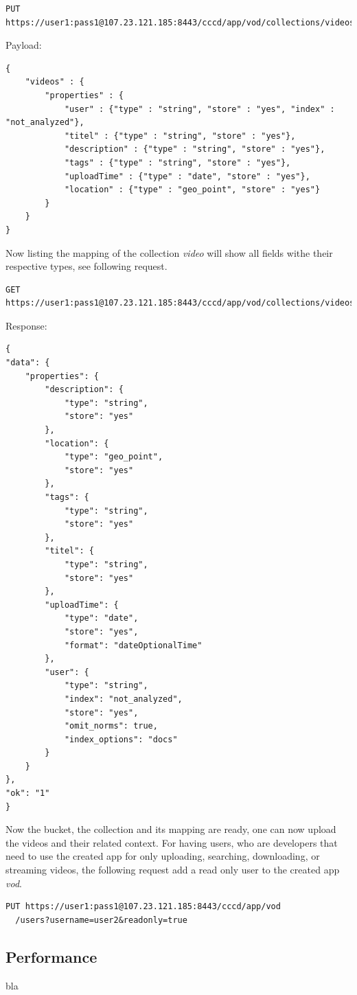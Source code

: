 \begin{code}
\begin{verbatim}
PUT https://user1:pass1@107.23.121.185:8443/cccd/app/vod/collections/videos/mapping
\end{verbatim}
Payload:
\begin{verbatim}
{
    "videos" : {
        "properties" : {
            "user" : {"type" : "string", "store" : "yes", "index" : "not_analyzed"},
            "titel" : {"type" : "string", "store" : "yes"},
            "description" : {"type" : "string", "store" : "yes"},
            "tags" : {"type" : "string", "store" : "yes"},
            "uploadTime" : {"type" : "date", "store" : "yes"},
            "location" : {"type" : "geo_point", "store" : "yes"}
        }
    }
}
\end{verbatim}
\end{code}

Now listing the mapping of the collection \textit{video} will show all fields withe their respective types, see following request.
\begin{code}
\begin{verbatim}
GET https://user1:pass1@107.23.121.185:8443/cccd/app/vod/collections/videos/mapping
\end{verbatim}
Response:
\begin{verbatim}
{
"data": {
	"properties": {
		"description": {
			"type": "string",
			"store": "yes"
		},
		"location": {
			"type": "geo_point",
			"store": "yes"
		},
		"tags": {
			"type": "string",
			"store": "yes"
		},
		"titel": {
			"type": "string",
			"store": "yes"
		},
		"uploadTime": {
			"type": "date",
			"store": "yes",
			"format": "dateOptionalTime"
		},
		"user": {
			"type": "string",
			"index": "not_analyzed",
			"store": "yes",
			"omit_norms": true,
			"index_options": "docs"
		}
	}
},
"ok": "1"
}
\end{verbatim}
\end{code}

Now the bucket, the collection and its mapping are ready, one can now upload the videos and their related context. For having users, who are developers that need to use the created app for only uploading, searching, downloading, or streaming videos, the following request add a read only user to the created app \textit{vod}.

\begin{code}
\begin{verbatim}
PUT https://user1:pass1@107.23.121.185:8443/cccd/app/vod
  /users?username=user2&readonly=true
\end{verbatim}
\end{code}


\subsection{Performance\label{seq:eval_perf}}
bla